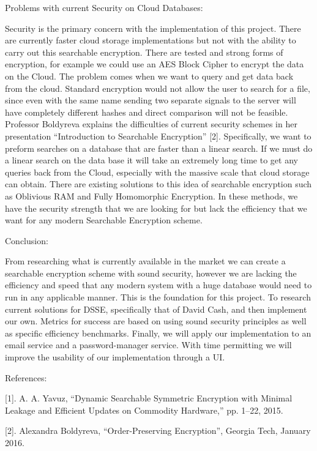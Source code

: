\documentclass[10pt]{letter} %
\begin{document}
\begin{letter}
Problems with current Security on Cloud Databases: 

	Security is the primary concern with the implementation of this project. There are currently faster cloud storage implementations but not with the ability to carry out this searchable encryption. There are tested and strong forms of encryption, for example we could use an AES Block Cipher to encrypt the data on the Cloud. The problem comes when we want to query and get data back from the cloud. Standard encryption would not allow the user to search for a file, since even with the same name sending two separate signals to the server will have completely different hashes and direct comparison will not be feasible. Professor Boldyreva explains the difficulties of current security schemes in her presentation “Introduction to Searchable Encryption” [2]. Specifically, we want to preform searches on a database that are faster than a linear search. If we must do a linear search on the data base it will take an extremely long time to get any queries back from the Cloud, especially with the massive scale that cloud storage can obtain. There are existing solutions to this idea of searchable encryption such as Oblivious RAM and Fully Homomorphic Encryption. In these methods, we have the security strength that we are looking for but lack the efficiency that we want for any modern Searchable Encryption scheme.

Conclusion: 

	From researching what is currently available in the market we can create a searchable encryption scheme with sound security, however we are lacking the efficiency and speed that any modern system with a huge database would need to run in any applicable manner. This is the foundation for this project. To research current solutions for DSSE, specifically that of David Cash, and then implement our own. Metrics for success are based on using sound security principles as well as specific efficiency benchmarks. Finally, we will apply our implementation to an email service and a password-manager service. With time permitting we will improve the usability of our implementation through a UI.
    
References:
    
[1]. A. A. Yavuz, “Dynamic Searchable Symmetric Encryption with Minimal Leakage and Efficient Updates on Commodity Hardware,” pp. 1–22, 2015. 

[2]. Alexandra Boldyreva, “Order-Preserving Encryption”, Georgia Tech, January 2016.






\end{letter}
\end{document}

